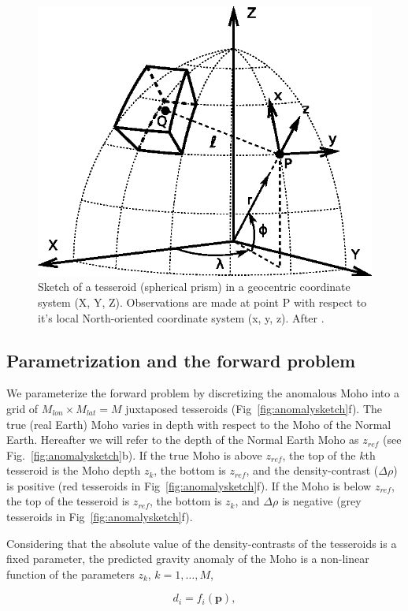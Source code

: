 \documentclass[extra,mreferee]{gji}
\begin{document}
\begin{figure}
    \centering
    \includegraphics[width=0.5\columnwidth]{figures/tesseroid-coord-sys}
    \caption{Sketch of a tesseroid (spherical prism) in a geocentric coordinate
        system (X, Y, Z).
        Observations are made at point P with respect to it's local
        North-oriented coordinate system (x, y, z).
        After \citet{uieda2015}.
    }
    \label{fig:tesseroid}
\end{figure}


\subsection{Parametrization and the forward problem}

We parameterize the forward problem by discretizing the anomalous Moho
into a grid of $M_{lon} \times M_{lat} = M$ juxtaposed tesseroids
(Fig~\ref{fig:anomalysketch}f).
The true (real Earth) Moho varies in depth
with respect to the Moho of the Normal Earth.
Hereafter we will refer to the depth of the Normal Earth Moho as $z_{ref}$
(see Fig.~\ref{fig:anomalysketch}b).
If the true Moho is above $z_{ref}$,
the top of the $k$th tesseroid is the Moho depth $z_{k}$,
the bottom is $z_{ref}$, and the density-contrast ($\Delta\rho$) is positive
(red tesseroids in Fig~\ref{fig:anomalysketch}f).
If the Moho is below $z_{ref}$, the top of the tesseroid is $z_{ref}$,
the bottom is $z_k$, and $\Delta\rho$ is negative
(grey tesseroids in Fig~\ref{fig:anomalysketch}f).

Considering that the absolute value of the density-contrasts
of the tesseroids is a fixed parameter,
the predicted gravity anomaly of the Moho is a non-linear function of the
parameters $z_k$, $k=1, \ldots, M$,

\begin{equation}
    d_i = f_i(\mathbf{p}),
    \label{eq:forward}
\end{equation}
\end{document}
